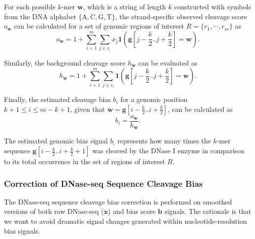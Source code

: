 For each possible $k$-mer $\mathbf{w}$, which is a string of length $k$ constructed with symbols from the DNA alphabet $\{\text{A}, \text{C}, \text{G}, \text{T}\}$, the strand-specific observed cleavage score ${o}_{\mathbf{w}}$ can be calculated for a set of genomic regions of interest $R = \{r_1, \cdots, r_m\}$ as
\begin{equation}
  \label{eq:obscleav}
  {o}_{\mathbf{w}} = 1 + \sum_{i=1}^{m} \sum_{j \in r_i} {x}_{j} \mathbf{1}\left( \mathbf{g}[j-\frac{k}{2} .. j+\frac{k}{2}] = \mathbf{w}\right).
\end{equation}

Similarly, the background cleavage score ${h}_{\mathbf{w}}$ can be evaluated as
\begin{equation}
  \label{eq:backcleav}
  {h}_{\mathbf{w}} = 1 + \sum_{i=1}^{m} \sum_{j \in r_i} \mathbf{1} \left( \mathbf{g}[j-\frac{k}{2} .. j+\frac{k}{2}] = \mathbf{w}\right).
\end{equation}

Finally, the estimated cleavage bias ${b}_{i}$ for a genomic position $k+1 \leq i \leq m-k+1$, given that $\mathbf{w}=\mathbf{g}[i-\frac{k}{2}..i+\frac{k}{2}]$, can be calculated as
\begin{equation}
  \label{eq:cleavbias}
  {b}_{i} = \frac{{o}_{\mathbf{w}}}{{h}_{\mathbf{w}}}.
\end{equation}

The estimated genomic bias signal ${b}_{i}$ represents how many times the $k$-mer sequence $\mathbf{g}[i-\frac{k}{2}..i+\frac{k}{2}+1]$ was cleaved by the DNase I enzyme in comparison to its total occurrence in the set of regions of interest $R$.

\subsubsection{Correction of DNase-seq Sequence Cleavage Bias}
\label{sec:correction.sequence.cleavage.bias}

The DNase-seq sequence cleavage bias correction is performed on smoothed versions of both raw DNase-seq ($\mathbf{x}$) and bias score $\mathbf{b}$ signals. The rationale is that we want to avoid dramatic signal changes generated within nucleotide-resolution bias signals.

